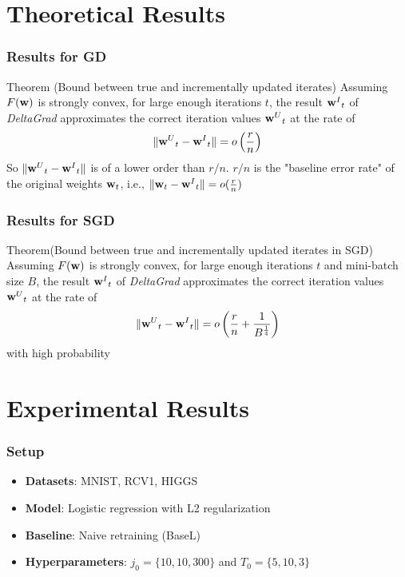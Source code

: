 \documentclass[pdf]{beamer}
\begin{document}
\section{Theoretical Results}

\begin{frame}
  \frametitle{Results for GD}
  \begin{block}{Theorem (Bound between true and incrementally updated iterates)}
    Assuming $F(\textbf{w})$ is strongly convex, for large enough iterations $t$, the result ${\textbf{w}^{I}}_{t}$ of \textit{DeltaGrad} approximates the correct iteration values ${\textbf{w}^{U}}_{t}$ at the rate of 
    $$
    \|{\textbf{w}^{U}}_{t}-{\textbf{w}^{I}}_{t}\| = o\left( \frac{r}{n} \right)
    $$
  So $\|{\textbf{w}^{U}}_{t}-{\textbf{w}^{I}}_{t}\|$ is of a lower order than $r/n$.
  $r/n$ is the "baseline error rate" of the original weights $\textbf{w}_{t}$, i.e., $\|\textbf{w}_{t}-{\textbf{w}^{I}}_{t}\| = o(\frac{r}{n})$ 
  \end{block}
  \hyperlink{architecture}{}
\end{frame}

\begin{frame}
  \frametitle{Results for SGD}
  \begin{block}{Theorem(Bound between true and incrementally updated iterates in SGD)}
  Assuming $F(\textbf{w})$ is strongly convex, for large enough iterations $t$ and mini-batch size $B$, the result ${\textbf{w}^{I}}_{t}$ of \textit{DeltaGrad} approximates the correct iteration values ${\textbf{w}^{U}}_{t}$ at the rate of
  $$
  \|{\textbf{w}^{U}}_{t}-{\textbf{w}^{I}}_{t}\| = o\left( \frac{r}{n} +\frac{1}{B^{\frac{1}{4}}}\right)
  $$
  with high probability
  \end{block}
  

\end{frame}
\section{Experimental Results}
\begin{frame}
  \frametitle{Setup}
  \begin{itemize}
    \item {\bf Datasets}: MNIST, RCV1, HIGGS
    \item {\bf Model}: Logistic regression with L2 regularization
    \item {\bf Baseline}: Naive retraining (BaseL)
    \item {\bf Hyperparameters}: $j_0 = \{10,10,300\}$ and $T_0 = \{5,10,3\}$
  \end{itemize}
\end{frame}
\end{document}
